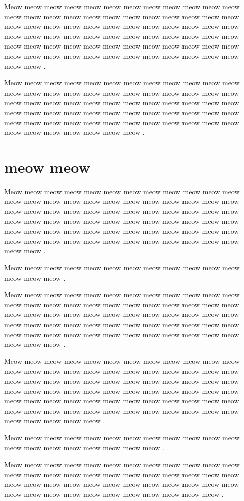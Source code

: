 \documentclass[12pt, a5paper, openany]{book}
\begin{document}
Meow meow meow meow meow meow meow meow meow meow meow meow meow meow meow meow meow meow meow meow meow meow meow meow meow meow meow meow meow meow meow meow meow meow meow meow meow meow meow meow meow meow meow meow meow meow meow meow meow meow meow meow meow meow meow meow meow meow meow meow meow meow meow meow meow meow meow meow meow meow meow meow meow meow .

Meow meow meow meow meow meow meow meow meow meow meow meow meow meow meow meow meow meow meow meow meow meow meow meow meow meow meow meow meow meow meow meow meow meow meow meow meow meow meow meow meow meow meow meow meow meow meow meow meow meow meow meow meow meow meow meow meow meow meow meow meow meow meow meow meow meow meow .



\chapter{meow meow }Meow meow meow meow meow meow meow meow meow meow meow meow meow meow meow meow meow meow meow meow meow meow meow meow meow meow meow meow meow meow meow meow meow meow meow meow meow meow meow meow meow meow meow meow meow meow meow meow meow meow meow meow meow meow meow meow meow meow meow meow meow meow meow meow meow meow meow meow meow meow meow meow meow meow .

Meow meow meow meow meow meow meow meow meow meow meow meow meow meow meow .

Meow meow meow meow meow meow meow meow meow meow meow meow meow meow meow meow meow meow meow meow meow meow meow meow meow meow meow meow meow meow meow meow meow meow meow meow meow meow meow meow meow meow meow meow meow meow meow meow meow meow meow meow meow meow meow meow meow meow meow meow meow meow meow .

Meow meow meow meow meow meow meow meow meow meow meow meow meow meow meow meow meow meow meow meow meow meow meow meow meow meow meow meow meow meow meow meow meow meow meow meow meow meow meow meow meow meow meow meow meow meow meow meow meow meow meow meow meow meow meow meow meow meow meow meow meow meow meow meow meow meow meow meow meow meow meow meow meow meow meow meow meow .

Meow meow meow meow meow meow meow meow meow meow meow meow meow meow meow meow meow meow meow meow .

Meow meow meow meow meow meow meow meow meow meow meow meow meow meow meow meow meow meow meow meow meow meow meow meow meow meow meow meow meow meow meow meow meow meow meow meow meow meow meow meow meow meow meow meow meow meow meow .
\end{document}
